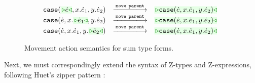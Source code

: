 \begin{figure}
\begin{displaymath}
\begin{array}{@{}rcl}
  \\
  \TABperformMove
      {      {\hcase{\zwsel{\hexp}}{x}{\hexp_1}{y}{\hexp_2}}}
      {\aMove{\dParent}}
      {\zwsel{\hcase{{\hexp}}{x}{\hexp_1}{y}{\hexp_2}}}
  \\
  \TABperformMove
      {      {\hcase{{\hexp}}{x}{\zwsel{\hexp_1}}{y}{\hexp_2}}}
      {\aMove{\dParent}}
      {\zwsel{\hcase{{\hexp}}{x}{\hexp_1}{y}{\hexp_2}}}
  \\
  \TABperformMove
      {      {\hcase{{\hexp}}{x}{\hexp_1}{y}{\zwsel{\hexp_2}}}}
      {\aMove{\dParent}}
      {\zwsel{\hcase{{\hexp}}{x}{\hexp_1}{y}{\hexp_2}}}
\end{array}
\end{displaymath}
\caption{Movement action semantics for sum type forms.}
\label{fig:sum-move}
\end{figure}

Next, we must correspondingly extend the syntax of Z-types and Z-expressions, following Huet's zipper pattern \cite{JFP::Huet1997}:
%

